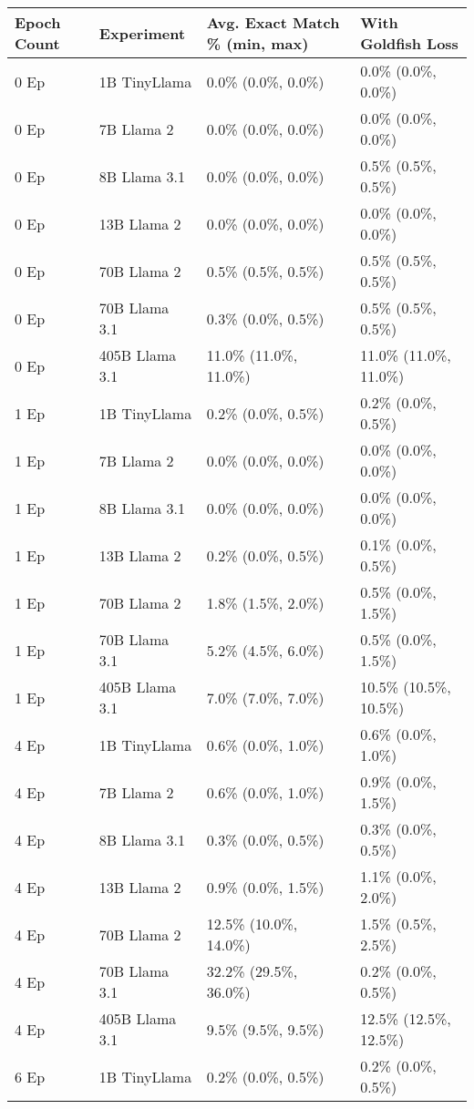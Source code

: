 
\begin{table}[h!]
\centering\tiny
\begin{tabular}{llll}
\toprule
Epoch Count & Experiment & Avg. Exact Match \% (min, max) & With Goldfish Loss \\
\midrule
0 Ep & 1B TinyLlama & 0.0\% (0.0\%, 0.0\%) & 0.0\% (0.0\%, 0.0\%) \\
0 Ep & 7B Llama 2 & 0.0\% (0.0\%, 0.0\%) & 0.0\% (0.0\%, 0.0\%) \\
0 Ep & 8B Llama 3.1 & 0.0\% (0.0\%, 0.0\%) & 0.5\% (0.5\%, 0.5\%) \\
0 Ep & 13B Llama 2 & 0.0\% (0.0\%, 0.0\%) & 0.0\% (0.0\%, 0.0\%) \\
0 Ep & 70B Llama 2 & 0.5\% (0.5\%, 0.5\%) & 0.5\% (0.5\%, 0.5\%) \\
0 Ep & 70B Llama 3.1 & 0.3\% (0.0\%, 0.5\%) & 0.5\% (0.5\%, 0.5\%) \\
0 Ep & 405B Llama 3.1 & 11.0\% (11.0\%, 11.0\%) & 11.0\% (11.0\%, 11.0\%) \\
1 Ep & 1B TinyLlama & 0.2\% (0.0\%, 0.5\%) & 0.2\% (0.0\%, 0.5\%) \\
1 Ep & 7B Llama 2 & 0.0\% (0.0\%, 0.0\%) & 0.0\% (0.0\%, 0.0\%) \\
1 Ep & 8B Llama 3.1 & 0.0\% (0.0\%, 0.0\%) & 0.0\% (0.0\%, 0.0\%) \\
1 Ep & 13B Llama 2 & 0.2\% (0.0\%, 0.5\%) & 0.1\% (0.0\%, 0.5\%) \\
1 Ep & 70B Llama 2 & 1.8\% (1.5\%, 2.0\%) & 0.5\% (0.0\%, 1.5\%) \\
1 Ep & 70B Llama 3.1 & 5.2\% (4.5\%, 6.0\%) & 0.5\% (0.0\%, 1.5\%) \\
1 Ep & 405B Llama 3.1 & 7.0\% (7.0\%, 7.0\%) & 10.5\% (10.5\%, 10.5\%) \\
4 Ep & 1B TinyLlama & 0.6\% (0.0\%, 1.0\%) & 0.6\% (0.0\%, 1.0\%) \\
4 Ep & 7B Llama 2 & 0.6\% (0.0\%, 1.0\%) & 0.9\% (0.0\%, 1.5\%) \\
4 Ep & 8B Llama 3.1 & 0.3\% (0.0\%, 0.5\%) & 0.3\% (0.0\%, 0.5\%) \\
4 Ep & 13B Llama 2 & 0.9\% (0.0\%, 1.5\%) & 1.1\% (0.0\%, 2.0\%) \\
4 Ep & 70B Llama 2 & 12.5\% (10.0\%, 14.0\%) & 1.5\% (0.5\%, 2.5\%) \\
4 Ep & 70B Llama 3.1 & 32.2\% (29.5\%, 36.0\%) & 0.2\% (0.0\%, 0.5\%) \\
4 Ep & 405B Llama 3.1 & 9.5\% (9.5\%, 9.5\%) & 12.5\% (12.5\%, 12.5\%) \\
6 Ep & 1B TinyLlama & 0.2\% (0.0\%, 0.5\%) & 0.2\% (0.0\%, 0.5\%) \\

\end{tabular}
\end{table}
